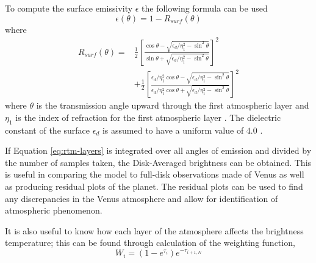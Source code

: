 To compute the surface emissivity $\epsilon$ the following formula can be used
\begin{equation}\label{eq:rtm-esurf}
\epsilon(\theta) = 1-R_{surf}(\theta)
\end{equation}
where
\begin{equation}\label{eq:rtm-rsurf}
\begin{split}
R_{surf}(\theta) =& \frac{1}{2} \left[ \frac{\cos\theta - \sqrt{\epsilon_d/\eta_1^2-\sin^2\theta}}{\sin\theta + \sqrt{\epsilon_d/\eta_1^2-\sin^2\theta}} \right]^2\\
&+\frac{1}{2} \left[ \frac{\epsilon_d/\eta_1^2 \cos\theta - \sqrt{\epsilon_d/\eta_1^2-\sin^2\theta}}{\epsilon_d/\eta_1^2 \cos\theta + \sqrt{\epsilon_d/\eta_1^2-\sin^2\theta}} \right]^2
\end{split}
\end{equation}
where $\theta$ is the transmission angle upward through the first atmospheric layer and $\eta_1$ is the index of refraction for the first atmospheric layer \cite{Jenkins-2002}. The dielectric constant of the surface $\epsilon_d$ is assumed to have a uniform value of $4.0$ \cite{Pettengill-1992}.

If Equation \ref{eq:rtm-layers} is integrated over all angles of emission and divided by the number of samples taken, the Disk-Averaged brightness can be obtained. This is useful in comparing the model to full-disk observations made of Venus as well as producing residual plots of the planet. The residual plots can be used to find any discrepancies in the Venus atmosphere and allow for identification of atmospheric phenomenon. 

It is also useful to know how each layer of the atmosphere affects the brightness temperature; this can be found through calculation of the weighting function,
\begin{equation}
W_i = (1-e^{\tau_i}) e^{-\tau_{i+1,N}}
\end{equation}











